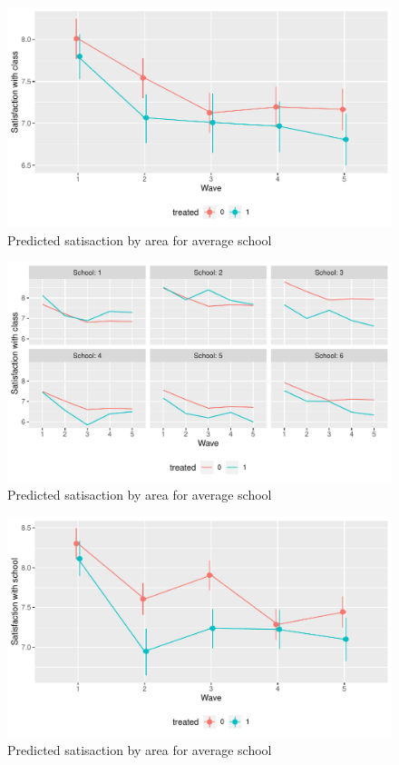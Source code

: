 \documentclass[a4, 12pt]{article}
\begin{document}
\begin{figure}[H]

{\centering \includegraphics[width=0.8\linewidth,]{../figures/sat_class_pred} 

}

\caption{Predicted satisaction by area for average school}\label{fig:sat-class-pred}
\end{figure}
\begin{figure}[H]

{\centering \includegraphics[width=0.8\linewidth,]{../figures/sat_class_pred_across_schools} 

}

\caption{Predicted satisaction by area for average school}\label{fig:sat-class-pred-across-schools}
\end{figure}
\begin{figure}[H]

{\centering \includegraphics[width=0.8\linewidth,]{../figures/sat_school_pred} 

}

\caption{Predicted satisaction by area for average school}\label{fig:sat-school-pred}
\end{figure}
\end{document}
